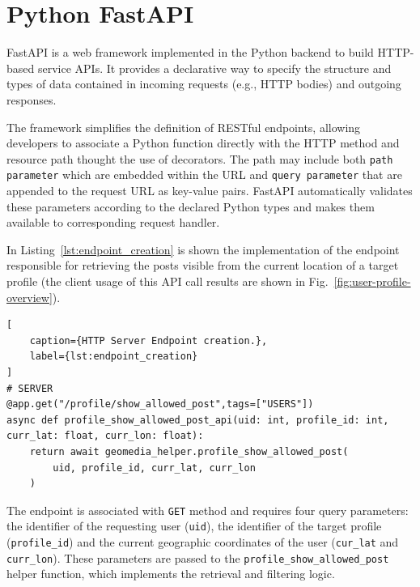 \section{Python FastAPI}

FastAPI is a web framework implemented in the Python backend to build HTTP-based service APIs. It provides a declarative way to specify the structure and types of data contained in incoming requests (e.g., HTTP bodies) and outgoing responses.


The framework simplifies the definition of RESTful endpoints, allowing developers to associate a Python function directly with the HTTP method and resource path thought the use of decorators.
The path may include both \texttt{path parameter} which are embedded within the URL and \texttt{query parameter} that are appended to the request URL as key-value pairs. FastAPI automatically validates these parameters according to the declared Python types and makes them available to corresponding request handler.

In Listing~\ref{lst:endpoint_creation} is shown the implementation of the endpoint responsible for retrieving the posts visible from the current location of a target profile (the client usage of this API call results are shown in Fig.~\ref{fig:user-profile-overview}).
\newpage


\begin{lstlisting}[
    caption={HTTP Server Endpoint creation.},
    label={lst:endpoint_creation}
]
# SERVER
@app.get("/profile/show_allowed_post",tags=["USERS"])
async def profile_show_allowed_post_api(uid: int, profile_id: int, curr_lat: float, curr_lon: float):
    return await geomedia_helper.profile_show_allowed_post( 
        uid, profile_id, curr_lat, curr_lon
    )
\end{lstlisting}

The endpoint is associated with \texttt{GET} method and requires four query parameters: the identifier of the requesting user (\texttt{uid}), the identifier of the target profile (\texttt{profile\_id}) and the current geographic coordinates of the user (\texttt{cur\_lat} and \texttt{curr\_lon}). These parameters are passed to the \texttt{profile\_show\_allowed\_post} helper function, which implements the retrieval and filtering logic.

